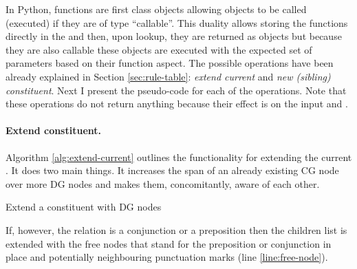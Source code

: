     In Python, functions are first class objects allowing objects to be called (executed) if they are of type ``callable''. This duality allows storing the functions directly in the \rt and then, upon lookup, they are returned as objects but because they are also callable these objects are executed with the expected set of parameters based on their function aspect. The possible operations have been already explained in Section \ref{sec:rule-table}: \textit{extend current} and \textit{new (sibling) constituent}. Next I present the pseudo-code for each of the operations. Note that these operations do not return anything because their effect is on the input \cg and \dg. 

    \paragraph{Extend constituent.} Algorithm \ref{alg:extend-current} outlines the functionality for extending the current \cgPointer. It does two main things. It increases the span of an already existing CG node over more DG nodes and makes them, concomitantly, aware of each other. 

    \begin{algorithm}[!ht]
    \Input { \cgPointer, \Children, \elementType, \edge, \dg, \cg}
    	\caption{Extend a constituent with DG nodes}
    	\label{alg:extend-current}
    \end{algorithm}

    If, however, the \edge relation is a conjunction or a preposition then the children list is extended with the free nodes that stand for the preposition or conjunction in place and potentially neighbouring punctuation marks (line \ref{line:free-node}). %

